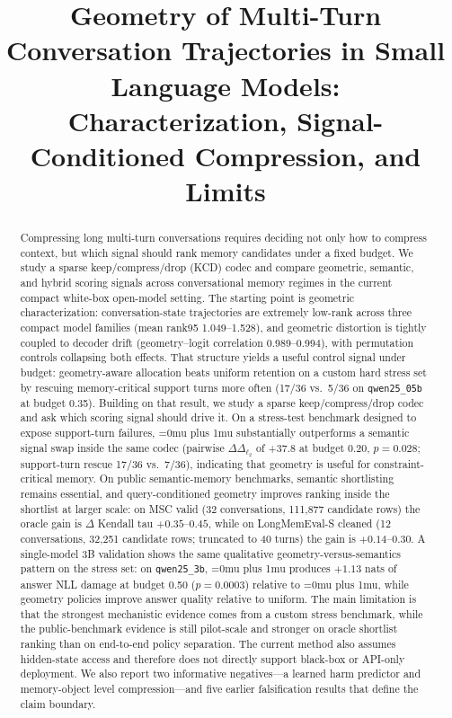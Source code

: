 \documentclass[conference]{IEEEtran}
\title{Geometry of Multi-Turn Conversation Trajectories in Small Language Models:\\
Characterization, Signal-Conditioned Compression, and Limits}
\author{
\IEEEauthorblockN{Pranav Kompally}
\IEEEauthorblockA{
Independent Research Checkpoint\\
New York, USA\\
\texttt{rt-geometry-memory repository checkpoint}
}
}
\newcommand{\Logit}{\Delta_{\ell_2}}
\newcommand{\pname}[1]{\begingroup\Urlmuskip=0mu plus 1mu\relax\path{#1}\endgroup}
\begin{document}
\maketitle

\begin{abstract}
Compressing long multi-turn conversations requires deciding not only how to compress context, but which signal should rank memory candidates under a fixed budget. We study a sparse keep/compress/drop (KCD) codec and compare geometric, semantic, and hybrid scoring signals across conversational memory regimes in the current compact white-box open-model setting. The starting point is geometric characterization: conversation-state trajectories are extremely low-rank across three compact model families (mean rank95 1.049--1.528), and geometric distortion is tightly coupled to decoder drift (geometry--logit correlation 0.989--0.994), with permutation controls collapsing both effects. That structure yields a useful control signal under budget: geometry-aware allocation beats uniform retention on a custom hard stress set by rescuing memory-critical support turns more often (17/36 vs.\ 5/36 on \texttt{qwen25\_05b} at budget 0.35). Building on that result, we study a sparse keep/compress/drop codec and ask which scoring signal should drive it. On a stress-test benchmark designed to expose support-turn failures, \pname{geometry_KCD} substantially outperforms a semantic signal swap inside the same codec (pairwise $\Delta\Logit$ of +37.8 at budget 0.20, $p=0.028$; support-turn rescue 17/36 vs.\ 7/36), indicating that geometry is useful for constraint-critical memory. On public semantic-memory benchmarks, semantic shortlisting remains essential, and query-conditioned geometry improves ranking inside the shortlist at larger scale: on MSC valid (32 conversations, 111{,}877 candidate rows) the oracle gain is $\Delta$ Kendall tau $+0.35$--$0.45$, while on LongMemEval-S cleaned (12 conversations, 32{,}251 candidate rows; truncated to 40 turns) the gain is $+0.14$--$0.30$. A single-model 3B validation shows the same qualitative geometry-versus-semantics pattern on the stress set: on \texttt{qwen25\_3b}, \pname{semantic_KCD} produces $+1.13$ nats of answer NLL damage at budget 0.50 ($p=0.0003$) relative to \pname{geometry_KCD}, while geometry policies improve answer quality relative to uniform. The main limitation is that the strongest mechanistic evidence comes from a custom stress benchmark, while the public-benchmark evidence is still pilot-scale and stronger on oracle shortlist ranking than on end-to-end policy separation. The current method also assumes hidden-state access and therefore does not directly support black-box or API-only deployment. We also report two informative negatives---a learned harm predictor and memory-object level compression---and five earlier falsification results that define the claim boundary.
\end{abstract}
\end{document}

